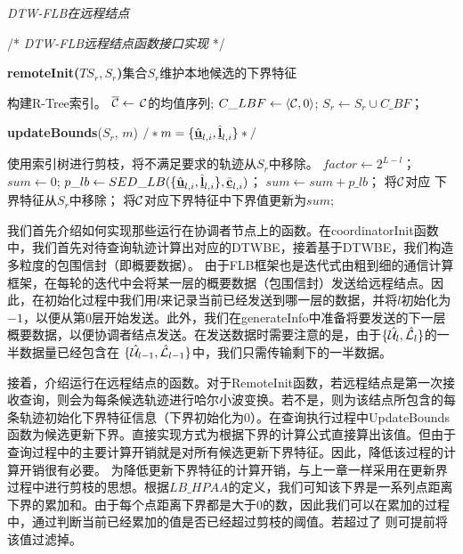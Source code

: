 \begin{algorithm}[t]
	\renewcommand{\baselinestretch}{1}
	\caption{{\sl DTW-FLB在远程结点} \label{alg:DTWRemote}}
	\begin{algorithmic}[2]
		\STATE /* \emph{DTW-FLB远程结点函数接口实现} */
	\end{algorithmic}
	\textbf{remoteInit($TS_{r} , S_{r}$)}\qquad 集合$S_{r}$维护本地候选的下界特征
	\begin{algorithmic}[1]
			\STATE 构建R-Tree索引。
				\STATE $\overline{\cal C} \leftarrow$  $\cal C$的均值序列; 
			\ENDFOR 
		\ENDIF
		\STATE $C\_LBF \leftarrow \langle {\cal C},  0 \rangle$;  
		\STATE $S_{r} \leftarrow S_{r} \cup C\_BF$；
		\ENDFOR
	\end{algorithmic}
	\textbf{updateBounds}($S_{r}$, $m$) \quad  $/*m=\{ \hat{\emph{{\textbf{u}}}}_{l,i}, \hat{\emph{{\textbf{l}}}}_{l,i} \}*/$
	\begin{algorithmic}[1]
			\STATE 使用索引树进行剪枝，将不满足要求的轨迹从$S_{r}$中移除。
		\ELSE
			\STATE $factor \leftarrow 2^{L-l}$；
			\STATE $sum \leftarrow 0$;
					\STATE $p\_lb \leftarrow SED\_LB(\{ \hat{\emph{{\textbf{u}}}}_{l,i}, \hat{\emph{{\textbf{l}}}}_{l,i} \}, \bar{\emph{{\textbf{c}}}}_{l,i})$；
					\STATE $sum \leftarrow sum+p\_lb$；
						\STATE 将$\cal C$对应 下界特征从$S_{r}$中移除；
					\ENDIF
			\ENDFOR 
			\STATE 将$\cal C$对应下界特征中下界值更新为$sum$;
		\ENDFOR
	\ENDIF
	\end{algorithmic}
\end{algorithm}
我们首先介绍如何实现那些运行在协调者节点上的函数。在\textsf{coordinatorInit}函数中，我们首先对待查询轨迹计算出对应的DTWBE，接着基于DTWBE，我们构造多粒度的包围信封（即概要数据）。
由于FLB框架也是迭代式由粗到细的通信计算框架，在每轮的迭代中会将某一层的概要数据（包围信封）发送给远程结点。因此，在初始化过程中我们用$l$来记录当前已经发送到哪一层的数据，并将$l$初始化为$-1$，以便从第0层开始发送。此外，我们在\textsf{generateInfo}中准备将要发送的下一层概要数据，以便协调者结点发送。在发送数据时需要注意的是，由于$ \{\hat{{\cal U}_{l}}, \hat{{\cal L}_{l}}\}$的一半数据量已经包含在 $\{\hat{{\cal U}}_{l-1}, \hat{{\cal L}}_{l-1}\}$中，我们只需传输剩下的一半数据。


接着，介绍运行在远程结点的函数。对于\textsf{RemoteInit}函数，若远程结点是第一次接收查询，则会为每条候选轨迹进行哈尔小波变换。若不是，则为该结点所包含的每条轨迹初始化下界特征信息（下界初始化为0）。在查询执行过程中\textsf{UpdateBounds}函数为候选更新下界。直接实现方式为根据下界的计算公式直接算出该值。但由于查询过程中的主要计算开销就是对所有候选更新下界特征。因此，降低该过程的计算开销很有必要。
为降低更新下界特征的计算开销，与上一章一样采用在更新界过程中进行剪枝的思想。根据$LB\_HPAA$的定义，我们可知该下界是一系列点距离下界的累加和。由于每个点距离下界都是大于0的数，因此我们可以在累加的过程中，通过判断当前已经累加的值是否已经超过剪枝的阈值。若超过了 则可提前将该值过滤掉。

